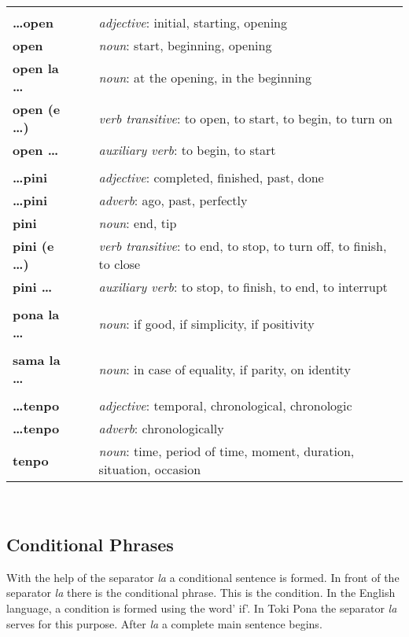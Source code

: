 \begin{supertabular}{p{2,5cm}|ll}
 && \\ %
%
\textbf{\dots open} && \textit{adjective}: initial, starting, opening \\ %
\textbf{open} && \textit{noun}: start, beginning, opening \\ %
\textbf{open la \dots} && \textit{noun}: at the opening, in the beginning  \\ %
\textbf{open (e \dots)} && \textit{verb transitive}: to open, to start, to begin, to turn on \\ %
\textbf{open \dots } && \textit{auxiliary verb}: to begin, to start \\ %
 && \\ %
%
\textbf{\dots pini} && \textit{adjective}: completed, finished, past, done \\ %
\textbf{\dots pini} && \textit{adverb}: ago, past, perfectly \\ %
\textbf{pini} && \textit{noun}: end, tip \\ %
\textbf{pini (e \dots)} && \textit{verb transitive}: to end, to stop, to turn off, to finish, to close \\ %
\textbf{pini \dots } && \textit{auxiliary verb}: to stop, to finish, to end, to interrupt \\ %
 && \\ %
%
\textbf{pona la \dots} && \textit{noun}: if good, if simplicity, if positivity \\ %
 && \\ %
%
\textbf{sama la \dots} && \textit{noun}: in case of equality, if parity, on identity  \\  
 && \\ %
%
\textbf{\dots tenpo} && \textit{adjective}: temporal, chronological, chronologic \\ %
\textbf{\dots tenpo} && \textit{adverb}: chronologically \\ %
\textbf{tenpo} && \textit{noun}: time, period of time, moment, duration, situation, occasion \\ %
%
\end{supertabular} \\
%
\newpage
%
\subsection*{Conditional Phrases}
%
%
With the help of the separator \textit{la} a conditional sentence is formed.
In front of the separator \textit{la} there is the conditional phrase. 
This is the condition. 
In the English language, a condition is formed using the word' if'.
In Toki Pona the separator \textit{la} serves for this purpose. 
After \textit{la} a complete main sentence begins.

